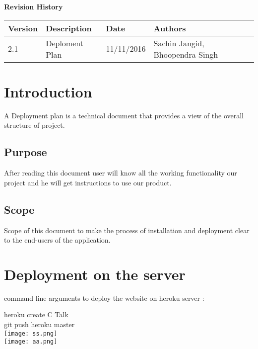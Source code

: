 \documentclass[12pt]{article}
\begin{document}
	\textbf{Revision History}
	\begin{center}
		\begin{tabular}{ | m{3em} | m{8em} | m{5em} | m{4em} | m{4em} | }
			\hline
			Version & Description & Date       & Authors             \\
			\hline
			2.1     & Deploment Plan    & 11/11/2016 & Sachin Jangid, Bhoopendra Singh   \\ 

			\hline
		
		\end{tabular}
	\end{center}
	
	\newpage
\tableofcontents
\newpage

\section{Introduction}
A Deployment plan is a technical document that provides a view of the overall structure of project. 
\\

\subsection{Purpose}
After reading this document user will know all the working functionality our project and he will get instructions to use our product. 


 \subsection{Scope}
 Scope of this document to make the process of installation and deployment clear to the end-users of the application.
 
 
\section{Deployment on the server}
command line arguments to deploy the website on heroku server :

heroku create C Talk \\

git push heroku master\\
	\texttt{[image: ss.png]}\\
	\texttt{[image: aa.png]}\\
	
	
\end{document}
